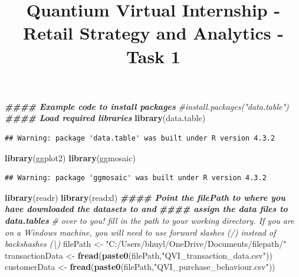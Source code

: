 \documentclass[
]{article}
\title{Quantium Virtual Internship - Retail Strategy and Analytics -
Task 1}
\author{}
\date{\vspace{-2.5em}}
\newenvironment{Shaded}{\begin{snugshade}}{\end{snugshade}}
\newcommand{\CommentTok}[1]{\textcolor[rgb]{0.56,0.35,0.01}{\textit{#1}}}
\newcommand{\DocumentationTok}[1]{\textcolor[rgb]{0.56,0.35,0.01}{\textbf{\textit{#1}}}}
\newcommand{\FunctionTok}[1]{\textcolor[rgb]{0.13,0.29,0.53}{\textbf{#1}}}
\newcommand{\NormalTok}[1]{#1}
\newcommand{\OtherTok}[1]{\textcolor[rgb]{0.56,0.35,0.01}{#1}}
\newcommand{\StringTok}[1]{\textcolor[rgb]{0.31,0.60,0.02}{#1}}
\begin{document}
\maketitle

\begin{Shaded}
\begin{Highlighting}[]
\DocumentationTok{\#\#\#\# Example code to install packages}
\CommentTok{\#install.packages("data.table")}
\DocumentationTok{\#\#\#\# Load required libraries}
\FunctionTok{library}\NormalTok{(data.table)}
\end{Highlighting}
\end{Shaded}

\begin{verbatim}
## Warning: package 'data.table' was built under R version 4.3.2
\end{verbatim}

\begin{Shaded}
\begin{Highlighting}[]
\FunctionTok{library}\NormalTok{(ggplot2)}
\FunctionTok{library}\NormalTok{(ggmosaic)}
\end{Highlighting}
\end{Shaded}

\begin{verbatim}
## Warning: package 'ggmosaic' was built under R version 4.3.2
\end{verbatim}

\begin{Shaded}
\begin{Highlighting}[]
\FunctionTok{library}\NormalTok{(readr)}
\FunctionTok{library}\NormalTok{(readxl)}
\DocumentationTok{\#\#\#\# Point the filePath to where you have downloaded the datasets to and}
\DocumentationTok{\#\#\#\# assign the data files to data.tables}
\CommentTok{\# over to you! fill in the path to your working directory. If you are on a Windows machine, you will need to use forward slashes (/) instead of backshashes (\textbackslash{})}
\NormalTok{filePath }\OtherTok{\textless{}{-}} \StringTok{"C:/Users/bhuyl/OneDrive/Documents/filepath/"}
\NormalTok{transactionData }\OtherTok{\textless{}{-}} \FunctionTok{fread}\NormalTok{(}\FunctionTok{paste0}\NormalTok{(filePath,}\StringTok{"QVI\_transaction\_data.csv"}\NormalTok{))}
\NormalTok{customerData }\OtherTok{\textless{}{-}} \FunctionTok{fread}\NormalTok{(}\FunctionTok{paste0}\NormalTok{(filePath,}\StringTok{"QVI\_purchase\_behaviour.csv"}\NormalTok{))}
\end{Highlighting}
\end{Shaded}
\end{document}
